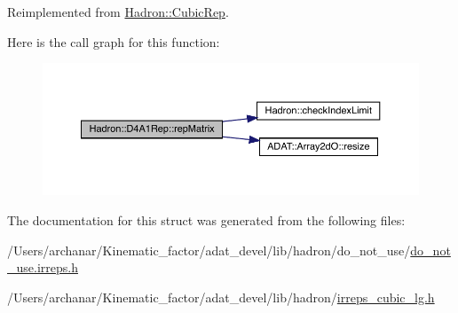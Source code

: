 Reimplemented from \mbox{\hyperlink{structHadron_1_1CubicRep_ac5d7e9e6f4ab1158b5fce3e4ad9e8005}{Hadron\+::\+Cubic\+Rep}}.

Here is the call graph for this function\+:
\nopagebreak
\begin{figure}[H]
\begin{center}
\leavevmode
\includegraphics[width=350pt]{d8/d02/structHadron_1_1D4A1Rep_a4dca745781630db08cee88f37cae21b6_cgraph}
\end{center}
\end{figure}


The documentation for this struct was generated from the following files\+:\begin{DoxyCompactItemize}
\item 
/\+Users/archanar/\+Kinematic\+\_\+factor/adat\+\_\+devel/lib/hadron/do\+\_\+not\+\_\+use/\mbox{\hyperlink{do__not__use_8irreps_8h}{do\+\_\+not\+\_\+use.\+irreps.\+h}}\item 
/\+Users/archanar/\+Kinematic\+\_\+factor/adat\+\_\+devel/lib/hadron/\mbox{\hyperlink{lib_2hadron_2irreps__cubic__lg_8h}{irreps\+\_\+cubic\+\_\+lg.\+h}}\end{DoxyCompactItemize}
